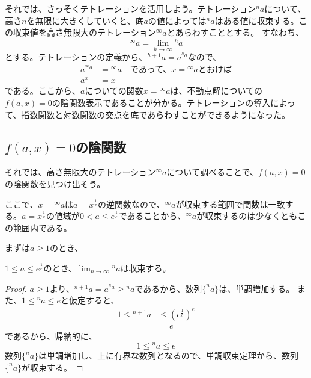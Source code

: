 	それでは、さっそくテトレーションを活用しよう。テトレーション$^n a$について、高さ$n$を無限に大きくしていくと、底$a$の値によっては$^n a$はある値に収束する。この収束値を高さ無限大のテトレーション$^\infty a$とあらわすこととする。
	すなわち、
	\begin{equation*}
		^\infty a = \lim_{h \to \infty} {^h a}
	\end{equation*}
	とする。テトレーションの定義から、$^{h+1} a = a^{^h a}$なので、
	\begin{align*}
		a ^{^\infty a} &= {^\infty a} \quad \text{であって、$x = {^\infty a}$とおけば} \\
		a^x &= x
	\end{align*}
	である。ここから、$a$についての関数$x = {^\infty a}$は、不動点解についての$f(a,x) = 0$の陰関数表示であることが分かる。テトレーションの導入によって、指数関数と対数関数の交点を底であらわすことができるようになった。
	
\subsection{$f(a,x)=0$の陰関数}
	それでは、高さ無限大のテトレーション$^\infty a$について調べることで、$f(a,x)=0$の陰関数を見つけ出そう。
	
	ここで、$x = {^\infty a}$は$a = x^\frac{1}{x}$の逆関数なので、${^\infty a}$が収束する範囲で関数は一致する。$a = x^\frac{1}{x}$の値域が$0 < a \leq e^\frac{1}{e}$であることから、${^\infty a}$が収束するのは少なくともこの範囲内である。
	
	まずは$a \geq 1$のとき、
	\begin{theorem}
	\label{th:tetration_convergence_a_greater_1}
		$1 \leq a \leq e^\frac{1}{e}$のとき、$\lim_{n \to \infty} {^n a}$は収束する。
	\end{theorem}
	\begin{proof}
	
		$a \geq 1$より、$^{n+1} a = a ^{^n a} \geq {^n a}$であるから、数列$\{^n a\}$は、単調増加する。
		また、$1 \leq {^n a} \leq e$と仮定すると、
		\begin{align*}
			1 \leq {^{n+1} a} &\leq (e^\frac{1}{e})^e \\
							  &= e
		\end{align*}
		であるから、帰納的に、
		\begin{equation*}
			1 \leq {^n a} \leq e
		\end{equation*}
		数列$\{^n a\}$は単調増加し、上に有界な数列となるので、単調収束定理から、数列$\{^n a\}$が収束する。
	\end{proof}
	

